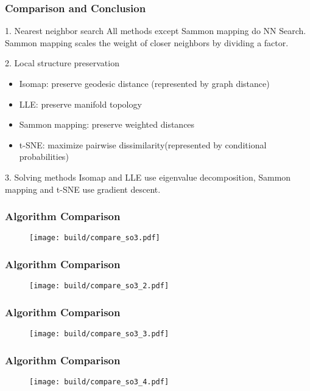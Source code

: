 \documentclass{beamer}
\begin{document}
% 
% 
% 
% 
% 
%
\begin{frame}
  \frametitle{Comparison and Conclusion}

  \begin{block}{1. Nearest neighbor search}
    All methods except Sammon mapping do NN Search. Sammon mapping scales the weight of closer neighbors by dividing a factor.
  \end{block}

  \begin{block}{2. Local structure preservation}
    \begin{itemize}
      \item Isomap: preserve geodesic distance (represented by graph distance)
      \item LLE: preserve manifold topology
      \item Sammon mapping: preserve weighted distances 
      \item t-SNE: maximize pairwise dissimilarity(represented by conditional probabilities)
    \end{itemize}
  \end{block}

  \begin{block}{3. Solving methods}
    Isomap and LLE use eigenvalue decomposition, Sammon mapping and t-SNE use gradient descent.
  \end{block}
    
\end{frame}

% 
% 
% 
% 
% 
%
\begin{frame}
  \frametitle{Algorithm Comparison}
  \begin{figure}
    \centering
    \texttt{[image: build/compare\_so3.pdf]}
  \end{figure}
\end{frame}
\begin{frame}
  \frametitle{Algorithm Comparison}
  \begin{figure}
    \centering
    \texttt{[image: build/compare\_so3\_2.pdf]}
  \end{figure}
\end{frame}
\begin{frame}
  \frametitle{Algorithm Comparison}
  \begin{figure}
    \centering
    \texttt{[image: build/compare\_so3\_3.pdf]}
  \end{figure}
\end{frame}
\begin{frame}
  \frametitle{Algorithm Comparison}
  \begin{figure}
    \centering
    \texttt{[image: build/compare\_so3\_4.pdf]}
  \end{figure}
\end{frame}

% 
% 
% 
% 
% 
%
    
\end{document}
